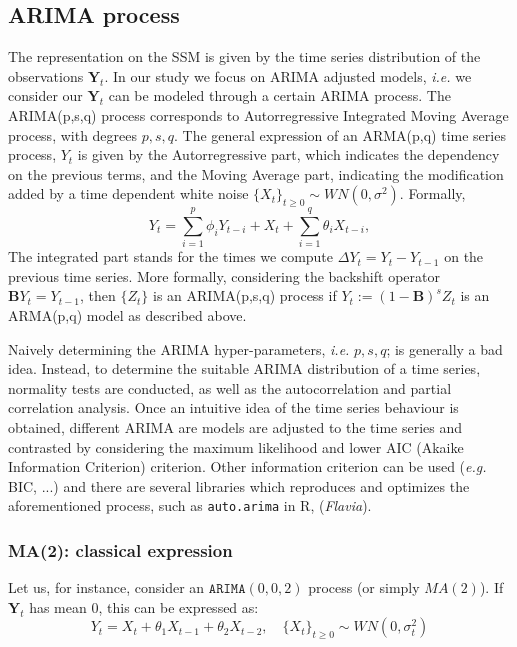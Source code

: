 \documentclass{article}
\theoremstyle{definition}
\theoremstyle{definition}
\theoremstyle{remark}
\theoremstyle{mythmstyle}
\begin{document}
\subsection{ARIMA process} \label{arima}

The representation on the SSM is given by the time series distribution of the observations $\bm{Y}_t$. In our study we focus on ARIMA adjusted models, \textit{i.e.} we consider our $\bm{Y}_t$ can be modeled through a certain ARIMA process. The ARIMA(p,s,q) process corresponds to Autorregressive Integrated Moving Average process, with degrees $p,s,q$. The general expression of an ARMA(p,q) time series process, $Y_t$ is given by the Autorregressive part, which indicates the dependency on the previous terms, and the Moving Average part, indicating the modification added by a time dependent white noise $\{X_t\}_{t \geq 0} \sim WN(0, \sigma^2)$. Formally,
$$
Y_t = \sum_{i=1}^p \phi_i Y_{t-i} + X_t + \sum_{i=1}^q \theta_i X_{t-i}, 
$$
The integrated part stands for the times we compute $\Delta Y_t = Y_t - Y_{t-1}$ on the previous time series. More formally, considering the backshift operator $\mathbf{B} Y_t = Y_{t-1}$, then $\{Z_t\}$ is an ARIMA(p,s,q) process if $Y_t := (1-\mathbf{B})^s Z_t$ is an ARMA(p,q) model as described above. 

Naively determining the ARIMA hyper-parameters, \textit{i.e.} $p, s, q$; is generally a bad idea. Instead, to determine the suitable ARIMA distribution of a time series, normality tests are conducted, as well as the autocorrelation and partial correlation analysis. Once an intuitive idea of the time series behaviour is obtained, different ARIMA are models are adjusted to the time series and contrasted by considering the maximum likelihood and lower AIC (Akaike Information Criterion) criterion. Other information criterion can be used (\textit{e.g.} BIC, ...) and there are several libraries which reproduces and optimizes the aforementioned process, such as \texttt{auto.arima} in R, \cite{autoarima} (\textit{Flavia}).

\subsubsection{MA(2): classical expression}\label{ma2}

Let us, for instance, consider an $\texttt{ARIMA}(0,0,2)$ process (or simply $MA(2)$). If $\bm{Y}_t$ has mean $0$, this can be expressed as:
\begin{equation}\label{eq:ma_2}
Y_t = X_t + \theta_1 X_{t-1} + \theta_2 X_{t-2}, \quad \{X_t\}_{t \geq 0} \sim WN(0, \sigma_t^2)    
\end{equation}
\end{document}
